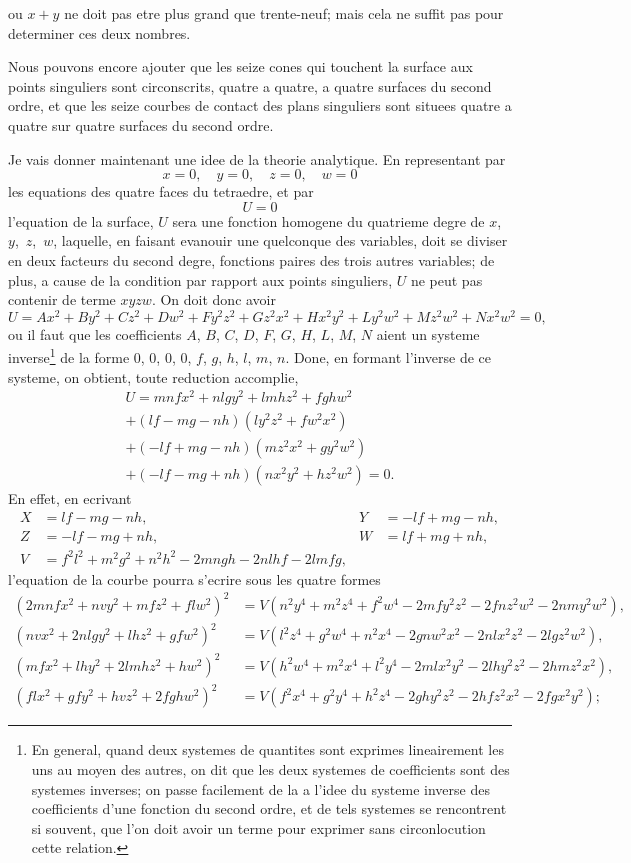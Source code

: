 \documentclass[11pt,a4paper]{article}
\begin{document}
\newpage
ou $x + y$ ne doit pas etre plus grand que trente-neuf; mais cela ne suffit pas pour determiner ces deux nombres.

Nous pouvons encore ajouter que les seize cones qui touchent la surface aux points singuliers sont circonscrits, quatre a quatre, a quatre surfaces du second ordre, et que les seize courbes de contact des plans singuliers sont situees quatre a quatre sur quatre surfaces du second ordre.

Je vais donner maintenant une idee de la theorie analytique. En representant par
\[
x = 0, \quad y = 0, \quad z = 0, \quad w = 0
\]
les equations des quatre faces du tetraedre, et par
\[
U = 0
\]
l'equation de la surface, $U$ sera une fonction homogene du quatrieme degre de $x$,~$y$,~$z$,~$w$, laquelle, en faisant evanouir une quelconque des variables, doit se diviser en deux facteurs du second degre, fonctions paires des trois autres variables; de plus, a cause de la condition par rapport aux points singuliers, $U$ ne peut pas contenir de terme $xyzw$. On doit donc avoir
\[
U = Ax^2 + By^2 + Cz^2 + Dw^2 + Fy^2z^2 + Gz^2x^2 + Hx^2y^2 + Ly^2w^2 + Mz^2w^2 + Nx^2w^2 = 0,
\]
ou il faut que les coefficients $A$, $B$, $C$, $D$, $F$, $G$, $H$, $L$, $M$, $N$ aient un systeme inverse\footnote{En general, quand deux systemes de quantites sont exprimes lineairement les uns au moyen des autres, on dit que les deux systemes de coefficients sont des systemes inverses; on passe facilement de la a l'idee du systeme inverse des coefficients d'une fonction du second ordre, et de tels systemes se rencontrent si souvent, que l'on doit avoir un terme pour exprimer sans circonlocution cette relation.} de la forme $0$, $0$, $0$, $0$, $f$, $g$, $h$, $l$, $m$, $n$. Done, en formant l'inverse de ce systeme, on obtient, toute reduction accomplie,
\begin{multline*}
U = mnfx^2 + nlgy^2 + lmhz^2 + fghw^2 \\
+ (lf-mg-nh)(ly^2z^2 + fw^2x^2) \\
+ (-lf+mg-nh)(mz^2x^2 + gy^2w^2) \\
+ (-lf-mg+nh)(nx^2y^2 + hz^2w^2) = 0.
\end{multline*}
En effet, en ecrivant
\begin{align*}
X &= lf-mg-nh, & Y &= -lf+mg-nh,\\
Z &= -lf-mg+nh, & W &= lf+mg+nh,\\
V &= f^2l^2 + m^2g^2 + n^2h^2 - 2mngh - 2nlhf - 2lmfg,
\end{align*}
l'equation de la courbe pourra s'ecrire sous les quatre formes
\begin{align*}
(2mnfx^2 + nvy^2 + mfz^2 + flw^2)^2 &= V(n^2y^4 + m^2z^4 + f^2w^4 - 2mfy^2z^2 - 2fnz^2w^2 - 2nmy^2w^2),\\
(nvx^2 + 2nlgy^2 + lhz^2 + gfw^2)^2 &= V(l^2z^4 + g^2w^4 + n^2x^4 - 2gnw^2x^2 - 2nlx^2z^2 - 2lgz^2w^2),\\
(mfx^2 + lhy^2 + 2lmhz^2 + hw^2)^2 &= V(h^2w^4 + m^2x^4 + l^2y^4 - 2mlx^2y^2 - 2lhy^2z^2 - 2hmz^2x^2),\\
(flx^2 + gfy^2 + hvz^2 + 2fghw^2)^2 &= V(f^2x^4 + g^2y^4 + h^2z^4 - 2ghy^2z^2 - 2hfz^2x^2 - 2fgx^2y^2);
\end{align*}
\end{document}
